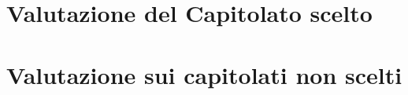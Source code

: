 \documentclass{article}
\begin{document}
\newpage

\tableofcontents

\newpage

\section{Valutazione del Capitolato scelto}


\section{Valutazione sui capitolati non scelti}






\end{document}
